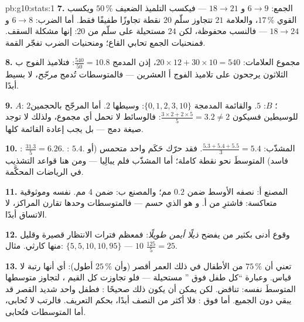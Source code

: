 \begin{solution}{pb:g10:stats:1}
\textbf{7.}  الجمع: $6 \to 9$ و $18 \to 21$ --- فيكسب
التلميذ الضعيف $50\,\%$ ويكسب القوي $17\,\%$، والعلامة $21$
تتجاوز سلّم $20$ نقطة تجاوزًا طفيفًا فقط. أما  الضرب:
$6 \to 8$ و $18 \to 24$ --- فالنسب محفوظة، لكن $24$
مستحيلة على سلّم من $20$: إنها مشكلة السقف. فمنحنيات
الجمع تحابي القاع؛ ومنحنيات الضرب تفجّر
القمة.

\textbf{8.} مجموع العلامات: $20 \times 12 + 30 \times 10 = 540$،
إذن  المدمج $\frac{540}{50} = 10.8$: فتلاميذ الفوج ب الثلاثون
يرجحون على تلاميذ الفوج أ العشرين --- فالمتوسطات تُدمج 
\emph{مرجّح}، لا  بسيط أبدًا.

\textbf{9.}  $A$: $2$؛  $B$: $5$. والقائمة المدمجة
$\{0, 1, 2, 3, 10\}$: وسيطها $2$. أما  المرجّح بالحجمين
للوسيطين فسيكون $\frac{3 \times 2 + 2 \times 5}{5} = 3.2
\neq 2$: فالوسائط لا تحمل أي مجموع، ولذلك لا توجد صيغة دمج
--- بل يجب إعادة  القائمة كلها.

\textbf{10.} : $\frac{31.3}{5} = 6.26$. : $5.4$.
 المشذّب: $\frac{5.3 + 5.4 + 5.5}{3} = 5.4$. فقد حرّك حَكَم
واحد متحمس (أو فاسد) المتوسطَ نحو نقطة كاملة؛
أما   المشذّب فلم يبالِيا --- ومن هنا
قواعد التشذيب في الرياضات المحكَّمة.

\textbf{11.} المصنع أ: نصفه الأوسط ضمن $0.2$ مم؛ والمصنع ب:
ضمن $4$ مم.  نفسه وموثوقية متعاكسة: فاشترِ من أ. و
 هو الذي حسم --- فالمتوسطات وحدها تقارن المراكز،
لا الاتساق أبدًا.

\textbf{12.} وقوع  أدنى بكثير من  يفضح \emph{ذيلًا أيمن
طويلًا}: فمعظم فترات الانتظار قصيرة وقليل منها كارثي. مثال:
$\{5, 5, 10, 10, 95\}$ ---  $10$ 
$\frac{125}{5} = 25$.

\textbf{13.} تعني أن $75\,\%$ من الأطفال في ذلك العمر
أقصر (وأن $25\,\%$ أطول): أي أنها رتبة لا قياس. وعبارة ``كل
طفل فوق '' مستحيلة --- فلو تجاوزت كل القيم
، لتجاوز متوسطها المتوسطَ نفسه:
تناقض. لكن يمكن أن يكون ذلك صحيحًا \emph{}: فطفل واحد شديد القصر
قد يبقي  دون الجميع. أما فوق
\emph{}: فلا أكثر من النصف أبدًا، بحكم التعريف. فالرتب
لا تُحابى، أما المتوسطات فتُحابى.


\end{solution}
